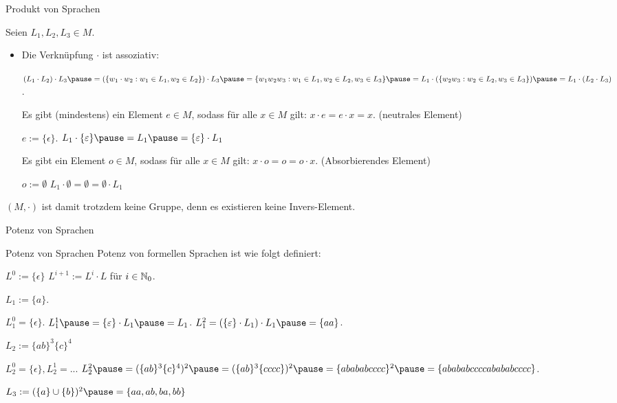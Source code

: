 \begin{frame}{Produkt von Sprachen}
	\pause 
	
	Seien $L_1, L_2, L_3 \in M$.
	
	\begin{itemize}
		\item Die Verknüpfung $\cdot$ ist assoziativ:
		\begin{itemize}
			\pitem $(L_1 \cdot L_2) \cdot L_3 \pause = (\{w_1\cdot w_2 : w_1 \in L_1, w_2 \in L_2\}) \cdot L_3 \pause = \{w_1w_2w_3 : w_1 \in L_1, w_2 \in L_2, w_3 \in L_3\} \pause = L_1 \cdot (\{w_2w_3 : w_2 \in L_2, w_3 \in L_3\}) \pause = L_1 \cdot (L_2 \cdot L_3)$.
		\end{itemize}
	
		\pitem Es gibt (mindestens) ein Element $e \in M$, sodass für alle $x \in M$ gilt: $x \cdot e = e \cdot x = x$. (neutrales Element)
		\begin{itemize}
			\pitem $e := \{\epsilon\}$.
			\pitem $L_1 \cdot \{\epsilon\} \pause = L_1 \pause = \{\epsilon\} \cdot L_1$
		\end{itemize}
	
		\pitem Es gibt ein Element $o \in M$, sodass für alle $x \in M$ gilt: $x \cdot o = o = o \cdot x$. (Absorbierendes Element)
		\begin{itemize}
			\pitem $o := \emptyset$
			\pitem $L_1 \cdot \emptyset = \emptyset = \emptyset \cdot L_1$
		\end{itemize}
	\end{itemize}

	$(M, \cdot)$ ist damit trotzdem keine Gruppe\p , denn es existieren keine Invers-Element.
\end{frame}

\begin{frame}{Potenz von Sprachen}
	
	\begin{block}{Potenz von Sprachen}
		Potenz von formellen Sprachen ist wie folgt definiert:
		\begin{itemize}
			\pitem $L^0 := \{\epsilon\}$
			\pitem $L^{i+1} := L^i \cdot L$ für $i \in \mathbb{N}_0$.
		\end{itemize}
	\end{block}

	\begin{itemize}
		\pitem $L_1 := \{a\}$.
		\begin{itemize}
			\pitem $L_1^0 = \{\epsilon\}$. \pause $L_1^1 \pause = \{\epsilon\} \cdot L_1 \pause = L_1$.
			\pitem $L_1^2 = (\{\epsilon\} \cdot L_1) \cdot L_1 \pause = \{aa\}$.
		\end{itemize}
		\pitem $L_2 := \{ab\}^3\{c\}^4$
		\begin{itemize}
			\pitem $L_2^0 = \{\epsilon\}, L_2^1 = ...$
			\pitem $L_2^2 \pause = (\{ab\}^3\{c\}^4)^2 \pause = (\{ab\}^3\{cccc\})^2 \pause = \{abababcccc\}^2 \pause = \{abababccccabababcccc\}$.
		\end{itemize}
		\pitem $L_3 := (\{a\} \cup \{b\})^2 \pause = \{aa, ab, ba, bb\}$
	\end{itemize}

\end{frame}

